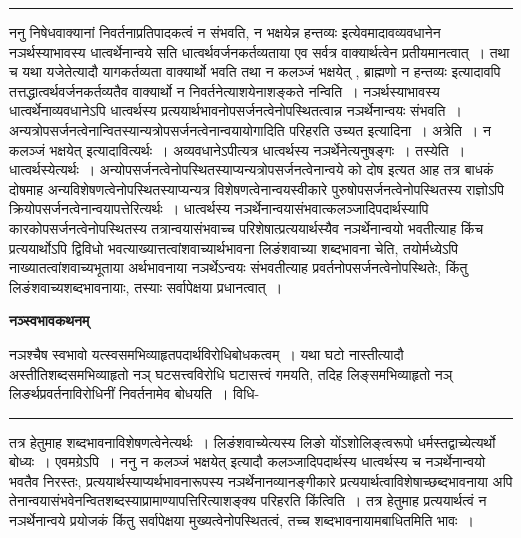 \documentclass[11pt, openany]{book}
\begin{document}
{}
\hrule
\vspace{3mm}
\noindent
 {\br ननु} निषेधवाक्यानां निवर्तनाप्रतिपादकत्वं न संभवति, {\qt न भक्षयेन्न  हन्तव्यः} इत्येवमादावव्यवधानेन नञर्थस्याभावस्य धात्वर्थेनान्वये सति धात्वर्थवर्जनकर्तव्यताया एव सर्वत्र वाक्यार्थत्वेन प्रतीयमानत्वात्~। तथा च यथा यजेतेत्यादौ यागकर्तव्यता वाक्यार्थो भवति तथा {\qt न कलञ्जं भक्षयेत् , ब्राह्मणो न हन्तव्यः}  इत्यादावपि तत्तद्धात्वर्थवर्जनकर्तव्यतैव वाक्यार्थो न निवर्तनेत्याशयेनाशङ्कते {\br नन्विति~।} नञर्थस्याभावस्य धात्वर्थेनाव्यवधानेऽपि धात्वर्थस्य प्रत्ययार्थभावनोपसर्जनत्वेनोपस्थितत्वान्न नञर्थेनान्वयः संभवति~। अन्यत्रोपसर्जनत्वेनान्वितस्यान्यत्रोपसर्जनत्वेनान्वयायोगादिति परिहरति {\br उच्यत इत्यादिना~। अत्रेति~।} {\qt न कलञ्जं भक्षयेत्} इत्यादावित्यर्थः~। अव्यवधानेऽपीत्यत्र धात्वर्थस्य नञर्थेनेत्यनुषङ्गः~। {\br तस्येति~।} धात्वर्थस्येत्यर्थः~। अन्योपसर्जनत्वेनोपस्थितस्याप्यन्यत्रोपसर्जनत्वेनान्वये को दोष इत्यत आह  तत्र बाधकं दोषमाह अन्यविशेषणत्वेनोपस्थितस्याप्यन्यत्र विशेषणत्वेनान्वयस्वीकारे पुरुषोपसर्जनत्वेनोपस्थितस्य राज्ञोऽपि क्रियोपसर्जनत्वेनान्वयापत्तेरित्यर्थः~। धात्वर्थस्य नञर्थेनान्वयासंभवात्कलञ्जादिपदार्थस्यापि  कारकोपसर्जनत्वेनोपस्थितस्य तत्रान्वयासंभवाच्च परिशेषात्प्रत्ययार्थस्यैव नञर्थेनान्वयो भवतीत्याह किंच प्रत्ययार्थोऽपि द्विविधो भवत्याख्यात्तत्वांशवाच्यार्थभावना लिङंशवाच्या शब्दभावना चेति, तयोर्मध्येऽपि नाख्यातत्वांशवाच्यभूताया अर्थभावनाया नञर्थेऽन्वयः संभवतीत्याह
\newpage
\fancyhead[RE]{[ नञ्स्वभावकथनम् ]}
{\bl\noindent
प्रवर्तनोपसर्जनत्वेनोपस्थितेः, किंतु लिङंशवाच्यशब्दभावनायाः,  तस्याः सर्वापेक्षया प्रधानत्वात्~।}
\begin{center}
 \textbf{नञ्स्वभावकथनम् }   
\end{center}
 
{\bl नञश्चैष स्वभावो यत्स्वसमभिव्याहृतपदार्थविरोधिबोधकत्वम्~। यथा घटो नास्तीत्यादौ अस्तीतिशब्दसमभिव्याहृतो नञ्  घटसत्त्वविरोधि घटासत्त्वं गमयति, तदिह लिङ्समभिव्याहृतो  नञ् लिङर्थप्रवर्तनाविरोधिनीं निवर्तनामेव बोधयति~। विधि-\\}
\hrule
\vspace{3mm}
\noindent
तत्र हेतुमाह शब्दभावनाविशेषणत्वेनेत्यर्थः~। लिङंशवाच्येत्यस्य लिङो योंऽशोलिङ्त्वरूपो धर्मस्तद्वाच्येत्यर्थो 
बोध्यः~। एवमग्रेऽपि~। {\br ननु} {\qt न कलञ्जं भक्षयेत्} इत्यादौ कलञ्जादिपदार्थस्य  धात्वर्थस्य च नञर्थेनान्वयो भवतैव निरस्तः, प्रत्ययार्थस्याप्यर्थभावनारूपस्य नञर्थेनानव्यानङ्गीकारे प्रत्ययार्थत्वाविशेषाच्छब्दभावनाया अपि तेनान्वयासंभवेनन्वितशब्दस्याप्रामाण्यापत्तिरित्याशङ्क्य परिहरति  {\br किंत्विति~।} तत्र 
हेतुमाह प्रत्ययार्थत्वं न नञर्थेनान्वये प्रयोजकं किंतु सर्वापेक्षया मुख्यत्वेनोपस्थितत्वं, तच्च शब्दभावनायामबाधितमिति भावः~।\\
\end{document}
